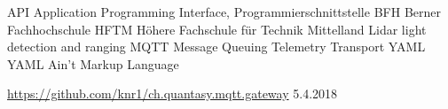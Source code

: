\documentclass[11pt,english,german]{report}
\begin{document}
   {API}   {Application Programming Interface, Programmierschnittstelle}
   {BFH}   {Berner Fachhochschule}
  {HFTM}  {Höhere Fachschule für Technik Mittelland}
 {Lidar} {light detection and ranging}
  {MQTT}  {Message Queuing Telemetry Transport}
  {YAML}  {YAML Ain’t Markup Language}

\printglossary[title=Glossar]

\printglossary[type=\acronymtype, title=Abkürzungsverzeichnis]

\begin{thebibliography}{1}
	 \url{https://github.com/knr1/ch.quantasy.mqtt.gateway} 5.4.2018

\end{thebibliography}


%
\end{document}
